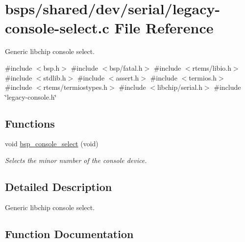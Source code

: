 \hypertarget{legacy-console-select_8c}{}\section{bsps/shared/dev/serial/legacy-\/console-\/select.c File Reference}
\label{legacy-console-select_8c}


Generic libchip console select.  


{\ttfamily \#include $<$bsp.\+h$>$}\newline
{\ttfamily \#include $<$bsp/fatal.\+h$>$}\newline
{\ttfamily \#include $<$rtems/libio.\+h$>$}\newline
{\ttfamily \#include $<$stdlib.\+h$>$}\newline
{\ttfamily \#include $<$assert.\+h$>$}\newline
{\ttfamily \#include $<$termios.\+h$>$}\newline
{\ttfamily \#include $<$rtems/termiostypes.\+h$>$}\newline
{\ttfamily \#include $<$libchip/serial.\+h$>$}\newline
{\ttfamily \#include \char`\"{}legacy-\/console.\+h\char`\"{}}\newline
\subsection*{Functions}
\begin{DoxyCompactItemize}
\item 
void \mbox{\hyperlink{legacy-console-select_8c_ae73dabc40ad9e53c57500f843066a0ff}{bsp\+\_\+console\+\_\+select}} (void)
\begin{DoxyCompactList}\small\item\em Selects the minor number of the console device. \end{DoxyCompactList}\end{DoxyCompactItemize}


\subsection{Detailed Description}
Generic libchip console select. 



\subsection{Function Documentation}
\mbox{\label{legacy-console-select_8c_ae73dabc40ad9e53c57500f843066a0ff}} 
